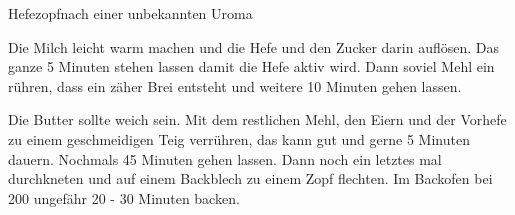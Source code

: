 \begin{recipe}{Hefezopf}{nach einer unbekannten Uroma}
  \label{Hefezopf}
  \inglist

  \steps
  Die Milch leicht warm machen und die Hefe und den Zucker darin auflösen. Das
  ganze 5 Minuten stehen lassen damit die Hefe aktiv wird. Dann soviel Mehl
  ein rühren, dass ein zäher Brei entsteht und weitere 10 Minuten gehen lassen.

  Die Butter sollte weich sein. Mit dem restlichen Mehl, den Eiern und der
  Vorhefe zu einem geschmeidigen Teig verrühren, das kann gut und gerne 5
  Minuten dauern. Nochmals 45 Minuten gehen lassen. Dann noch ein letztes mal
  durchkneten und auf einem Backblech zu einem Zopf flechten. Im Backofen bei
  200 \celsius ungefähr 20 - 30 Minuten backen.

\end{recipe}
